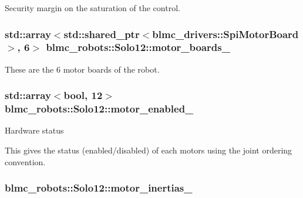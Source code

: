 Security margin on the saturation of the control. 

\subsubsection[{\texorpdfstring{motor\+\_\+boards\+\_\+}{motor_boards_}}]{\setlength{\rightskip}{0pt plus 5cm}std\+::array$<$std\+::shared\+\_\+ptr$<$blmc\+\_\+drivers\+::\+Spi\+Motor\+Board$>$, 6$>$ blmc\+\_\+robots\+::\+Solo12\+::motor\+\_\+boards\+\_\+\hspace{0.3cm}{\ttfamily [private]}}\hypertarget{classblmc__robots_1_1Solo12_a84c520852a2ebd410eff9795e37473b3}{}\label{classblmc__robots_1_1Solo12_a84c520852a2ebd410eff9795e37473b3}


These are the 6 motor boards of the robot. 

\subsubsection[{\texorpdfstring{motor\+\_\+enabled\+\_\+}{motor_enabled_}}]{\setlength{\rightskip}{0pt plus 5cm}std\+::array$<$bool, 12$>$ blmc\+\_\+robots\+::\+Solo12\+::motor\+\_\+enabled\+\_\+\hspace{0.3cm}{\ttfamily [private]}}\hypertarget{classblmc__robots_1_1Solo12_a50b6c097724e01436424b1f1c8dd0dd2}{}\label{classblmc__robots_1_1Solo12_a50b6c097724e01436424b1f1c8dd0dd2}




 Hardware status 

This gives the status (enabled/disabled) of each motors using the joint ordering convention. 
\subsubsection[{\texorpdfstring{motor\+\_\+inertias\+\_\+}{motor_inertias_}}]{ blmc\+\_\+robots\+::\+Solo12\+::motor\+\_\+inertias\+\_\+\hspace{0.3cm}{\ttfamily [private]}}\hypertarget{classblmc__robots_1_1Solo12_a625a9e4fe0be2fcad91a670d12f18bf3}{}\label{classblmc__robots_1_1Solo12_a625a9e4fe0be2fcad91a670d12f18bf3}


